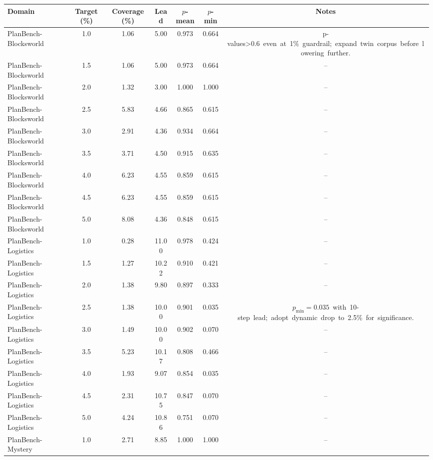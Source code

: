 \begin{tabular}{lcccccc}
\toprule
Domain & Target (\%) & Coverage (\%) & Lead & $p$-mean & $p$-min & Notes\\
\midrule
PlanBench-Blocksworld & 1.0 & 1.06 & 5.00 & 0.973 & 0.664 & \mbox{p-values>0.6 even at 1\% guardrail; expand twin corpus before lowering further.}\\
PlanBench-Blocksworld & 1.5 & 1.06 & 5.00 & 0.973 & 0.664 & \multicolumn{1}{c}{--}\\
PlanBench-Blocksworld & 2.0 & 1.32 & 3.00 & 1.000 & 1.000 & \multicolumn{1}{c}{--}\\
PlanBench-Blocksworld & 2.5 & 5.83 & 4.66 & 0.865 & 0.615 & \multicolumn{1}{c}{--}\\
PlanBench-Blocksworld & 3.0 & 2.91 & 4.36 & 0.934 & 0.664 & \multicolumn{1}{c}{--}\\
PlanBench-Blocksworld & 3.5 & 3.71 & 4.50 & 0.915 & 0.635 & \multicolumn{1}{c}{--}\\
PlanBench-Blocksworld & 4.0 & 6.23 & 4.55 & 0.859 & 0.615 & \multicolumn{1}{c}{--}\\
PlanBench-Blocksworld & 4.5 & 6.23 & 4.55 & 0.859 & 0.615 & \multicolumn{1}{c}{--}\\
PlanBench-Blocksworld & 5.0 & 8.08 & 4.36 & 0.848 & 0.615 & \multicolumn{1}{c}{--}\\
PlanBench-Logistics & 1.0 & 0.28 & 11.00 & 0.978 & 0.424 & \multicolumn{1}{c}{--}\\
PlanBench-Logistics & 1.5 & 1.27 & 10.22 & 0.910 & 0.421 & \multicolumn{1}{c}{--}\\
PlanBench-Logistics & 2.0 & 1.38 & 9.80 & 0.897 & 0.333 & \multicolumn{1}{c}{--}\\
PlanBench-Logistics & 2.5 & 1.38 & 10.00 & 0.901 & 0.035 & \mbox{$p_{\min}=0.035$ with 10-step lead; adopt dynamic drop to 2.5\% for significance.}\\
PlanBench-Logistics & 3.0 & 1.49 & 10.00 & 0.902 & 0.070 & \multicolumn{1}{c}{--}\\
PlanBench-Logistics & 3.5 & 5.23 & 10.17 & 0.808 & 0.466 & \multicolumn{1}{c}{--}\\
PlanBench-Logistics & 4.0 & 1.93 & 9.07 & 0.854 & 0.035 & \multicolumn{1}{c}{--}\\
PlanBench-Logistics & 4.5 & 2.31 & 10.75 & 0.847 & 0.070 & \multicolumn{1}{c}{--}\\
PlanBench-Logistics & 5.0 & 4.24 & 10.86 & 0.751 & 0.070 & \multicolumn{1}{c}{--}\\
PlanBench-Mystery & 1.0 & 2.71 & 8.85 & 1.000 & 1.000 & \multicolumn{1}{c}{--}\\

\end{tabular}
